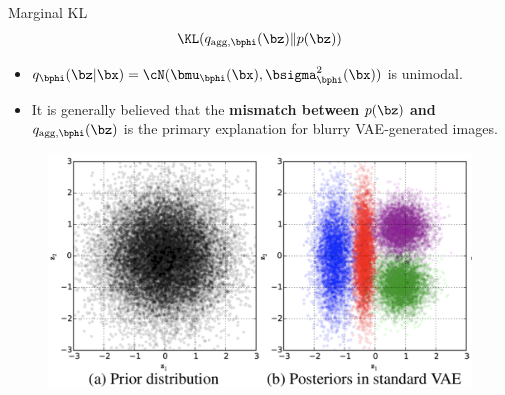 \documentclass{beamer}
\begin{document}
\begin{frame}{Marginal KL}
	\[
		\KL(q_{\text{agg}, \bphi}(\bz) \| p(\bz))
	\]
	\vspace{-0.5cm}
	\begin{itemize}
		\item $q_{\bphi}(\bz| \bx) = \cN(\bmu_{\bphi}(\bx), \bsigma^2_{\bphi}(\bx))$ is unimodal. 
		\item It is generally believed that the \textbf{mismatch between} $p(\bz)$  \textbf{and} $q_{\text{agg}, \bphi}(\bz)$  is the primary explanation for blurry VAE-generated images.
	\end{itemize}
    \eqpause
	\begin{figure}
		\includegraphics[width=0.8\linewidth]{figs/agg_posterior}
	\end{figure}
\end{frame}
\end{document}
